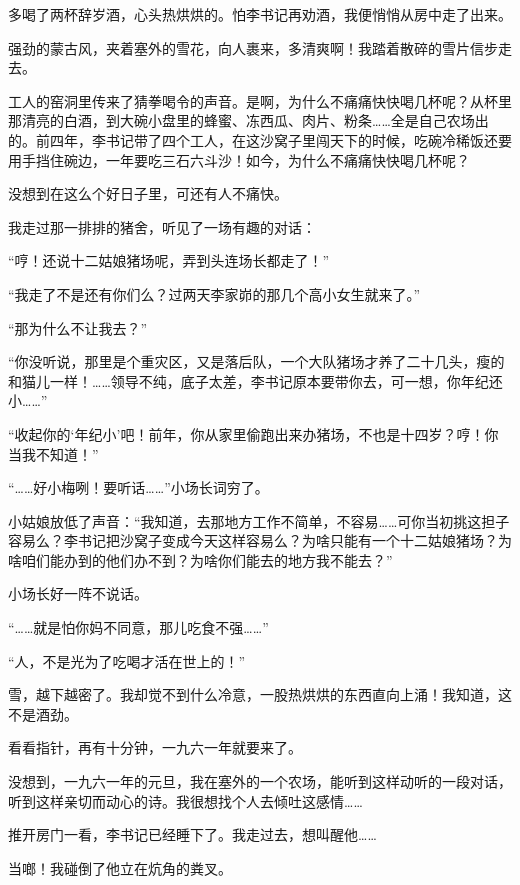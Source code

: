 \documentclass[12pt,UTF-8,openany]{ctexbook}
\begin{document}
\begin{normalsize}
    
    多喝了两杯辞岁酒，心头热烘烘的。怕李书记再劝酒，我便悄悄从房中走了出来。
    
    强劲的蒙古风，夹着塞外的雪花，向人裹来，多清爽啊！我踏着散碎的雪片信步走去。
    
    工人的窑洞里传来了猜拳喝令的声音。是啊，为什么不痛痛快快喝几杯呢？从杯里那清亮的白酒，到大碗小盘里的蜂蜜、冻西瓜、肉片、粉条……全是自己农场出的。前四年，李书记带了四个工人，在这沙窝子里闯天下的时候，吃碗冷稀饭还要用手挡住碗边，一年要吃三石六斗沙！如今，为什么不痛痛快快喝几杯呢？
    
    没想到在这么个好日子里，可还有人不痛快。
    
    我走过那一排排的猪舍，听见了一场有趣的对话：
    
    “哼！还说十二姑娘猪场呢，弄到头连场长都走了！”
    
    “我走了不是还有你们么？过两天李家峁的那几个高小女生就来了。”
    
    “那为什么不让我去？”
    
    “你没听说，那里是个重灾区，又是落后队，一个大队猪场才养了二十几头，瘦的和猫儿一样！……领导不纯，底子太差，李书记原本要带你去，可一想，你年纪还小……”
    
    “收起你的‘年纪小’吧！前年，你从家里偷跑出来办猪场，不也是十四岁？哼！你当我不知道！”
    
    “……好小梅咧！要听话……”小场长词穷了。
    
    小姑娘放低了声音：“我知道，去那地方工作不简单，不容易……可你当初挑这担子容易么？李书记把沙窝子变成今天这样容易么？为啥只能有一个十二姑娘猪场？为啥咱们能办到的他们办不到？为啥你们能去的地方我不能去？”
    
    小场长好一阵不说话。
    
    “……就是怕你妈不同意，那儿吃食不强……”
    
    “人，不是光为了吃喝才活在世上的！”
    
    雪，越下越密了。我却觉不到什么冷意，一股热烘烘的东西直向上涌！我知道，这不是酒劲。
    
    看看指针，再有十分钟，一九六一年就要来了。
    
    没想到，一九六一年的元旦，我在塞外的一个农场，能听到这样动听的一段对话，听到这样亲切而动心的诗。我很想找个人去倾吐这感情……
    
    推开房门一看，李书记已经睡下了。我走过去，想叫醒他……
    
    当啷！我碰倒了他立在炕角的粪叉。
    

\end{normalsize}
\end{document}
